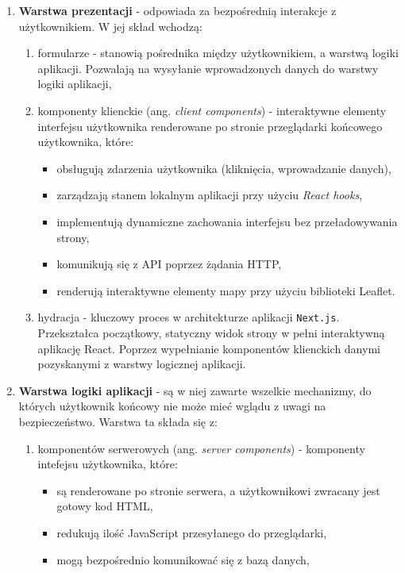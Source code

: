 \begin{enumerate}
    \item \textbf{Warstwa prezentacji} - odpowiada za bezpośrednią interakcje z użytkownikiem. W jej skład wchodzą:
    \begin{enumerate}
        \item formularze - stanowią pośrednika między użytkownikiem, a warstwą logiki aplikacji. Pozwalają na wysyłanie wprowadzonych danych do warstwy logiki aplikacji,
        \item komponenty klienckie (ang. \emph{client components}) - interaktywne elementy interfejsu użytkownika renderowane po stronie przeglądarki końcowego użytkownika, które:
        \begin{itemize}
            \item obsługują zdarzenia użytkownika (kliknięcia, wprowadzanie danych),
            \item zarządzają stanem lokalnym aplikacji przy użyciu \emph{React hooks},
            \item implementują dynamiczne zachowania interfejsu bez przeładowywania strony,
            \item komunikują się z API poprzez żądania HTTP,
            \item renderują interaktywne elementy mapy przy użyciu biblioteki Leaflet.
        \end{itemize}
        \item hydracja - kluczowy proces w architekturze aplikacji \texttt{Next.js}. Przekształca początkowy, statyczny widok strony w pełni interaktywną aplikację React. Poprzez wypełnianie komponentów klienckich danymi pozyskanymi z warstwy logicznej aplikacji.
    \end{enumerate}
    \item \textbf{Warstwa logiki aplikacji} - są w niej zawarte wszelkie mechanizmy, do których użytkownik końcowy nie może mieć wglądu z uwagi na bezpieczeństwo. Warstwa ta składa się z:
    \begin{enumerate}
        \item komponentów serwerowych (ang. \emph{server components}) - komponenty intefejsu użytkownika, które:
        \begin{itemize}
            \item są renderowane po stronie serwera, a użytkownikowi zwracany jest gotowy kod HTML,
            \item redukują ilość JavaScript przesyłanego do przeglądarki,
            \item mogą bezpośrednio komunikować się z bazą danych,

\end{itemize}
\end{enumerate}
\end{enumerate}
